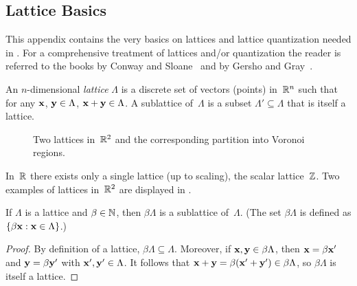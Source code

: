 \begin{subappendices}
  \section{Lattice Basics}\label{app:latticebasics}

  This appendix contains the very basics on lattices and lattice quantization
  needed in . For a comprehensive treatment of
  lattices and/or quantization the reader is referred to the books by Conway and
  Sloane~\cite{ConwayS1988} and by Gersho and Gray~\cite{GershoG1992}.

  \begin{definition}
    An $n$-dimensional \emph{lattice} $\Lambda$ is a discrete set of vectors
    (points) in~$\mathbb{R}^n$ such that for any $\mathbf{x}$, $\mathbf{y} \in \Lambda$, $\mathbf{x} + \mathbf{y} \in
    \Lambda$. A sublattice of~$\Lambda$ is a subset $\Lambda' \subseteq \Lambda$
    that is itself a lattice. 
  \end{definition}

  \begin{figure}
    \centerline{%
    \hfil
    }
    \caption{Two lattices in~$\mathbb{R}^2$ and the corresponding partition into Voronoi
    regions.}
    \label{fig:r2lattices}
  \end{figure}

  \begin{example}
    \label{ex:scalarlattice}
    In~$\mathbb{R}$ there exists only a single lattice (up to scaling), the scalar
    lattice~$\mathbb{Z}$. Two examples of lattices in~$\mathbb{R}^2$ are displayed in
    .
  \end{example}

  \begin{proposition}
    \label{prop:intsublattice}
    If $\Lambda$ is a lattice and $\beta \in {\mathbb{N}}$, then $\beta \Lambda$ is a
    sublattice of~$\Lambda$. (The set $\beta \Lambda$ is defined as $\{ \beta \mathbf{x}
    : \mathbf{x} \in \Lambda\}$.)
  \end{proposition}

  \begin{proof}
    By definition of a lattice, $\beta \Lambda \subseteq \Lambda$. Moreover, if
    $\mathbf{x}, \mathbf{y} \in \beta \Lambda$, then $\mathbf{x} = \beta \mathbf{x}'$ and $\mathbf{y} = \beta \mathbf{y}'$ with
    $\mathbf{x}', \mathbf{y}' \in \Lambda$. It follows that $\mathbf{x} + \mathbf{y} = \beta (\mathbf{x}' + \mathbf{y}') \in \beta
    \Lambda$, so $\beta\Lambda$ is itself a lattice.
  \end{proof}


\end{subappendices}
